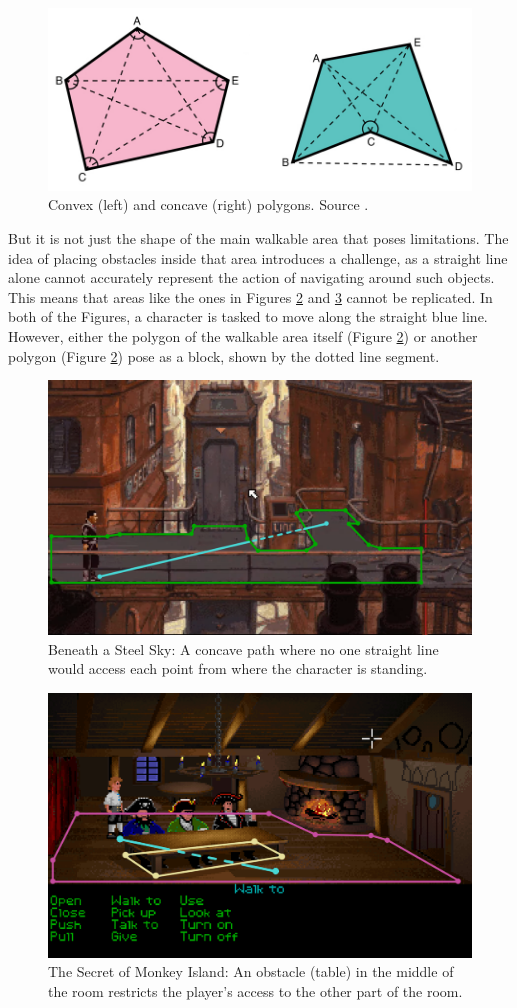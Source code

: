 \begin{figure}[H]
\centering
\includegraphics[width=.8\linewidth]{img/polygons.png}
\caption{Convex (left) and concave (right) polygons. Source \cite{Polygons}.}
\label{fig:Polygons}
\end{figure}

But it is not just the shape of the main walkable area that poses limitations. The idea of placing obstacles inside that area introduces a challenge, as a straight line alone cannot accurately represent the action of navigating around such objects. This means that areas like the ones in Figures \ref{fig:Path-B}  and \ref{fig:Path-M}  cannot be replicated. In both of the Figures, a character is tasked to move along the straight blue line. However, either the polygon of the walkable area itself (Figure \ref{fig:Path-B}) or another polygon (Figure \ref{fig:Path-B}) pose as a block, shown by the dotted line segment.

\begin{figure}[H]
\centering
\includegraphics[width=.7\linewidth]{img/Path-BaSS2.png}
\caption{Beneath a Steel Sky: A concave path where no one straight line would access each point from where the character is standing.}
\label{fig:Path-B}
\end{figure}

\begin{figure}[H]
\centering
\includegraphics[width=.7\linewidth]{img/Path-TSoMI2.png}
\caption{The Secret of Monkey Island: An obstacle (table) in the middle of the room restricts the player's access to the other part of the room.}
\label{fig:Path-M}
\end{figure}

